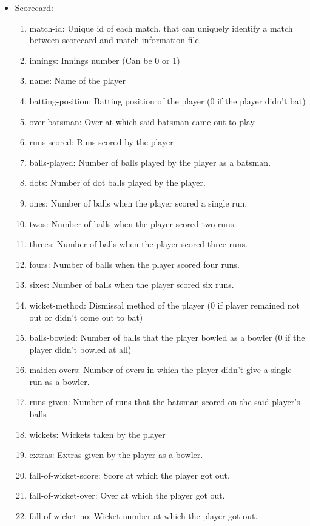 \documentclass[fleqn,10pt]{wlscirep}
\begin{document}
\begin{itemize}
\item Scorecard:
\begin{enumerate}
    \item match-id: Unique id of each match, that can uniquely identify a match between scorecard and match information file.
    \item innings: Innings number (Can be 0 or 1)
    \item name: Name of the player
    \item batting-position: Batting position of the player (0 if the player didn't bat)
    \item over-batsman: Over at which said batsman came out to play
    \item runs-scored: Runs scored by the player
    \item balls-played: Number of balls played by the player as a batsman.
    \item dots: Number of dot balls played by the player.
    \item ones: Number of balls when the player scored a single run.
    \item twos: Number of balls when the player scored two runs.
    \item threes: Number of balls when the player scored three runs.
    \item fours: Number of balls when the player scored four runs.
    \item sixes: Number of balls when the player scored six runs.
    \item wicket-method: Dismissal method of the player (0 if player remained not out or didn't come out to bat)
    \item balls-bowled: Number of balls that the player bowled as a bowler (0 if the player didn't bowled at all)
    \item maiden-overs: Number of overs in which the player didn't give a single run as a bowler.
    \item runs-given: Number of runs that the batsman scored on the said player's balls 
    \item wickets: Wickets taken by the player 
    \item extras: Extras given by the player as a bowler.
    \item fall-of-wicket-score: Score at which the player got out.
    \item fall-of-wicket-over: Over at which the player got out.
    \item fall-of-wicket-no: Wicket number at which the player got out.

\end{enumerate}
\end{itemize}
\end{document}
